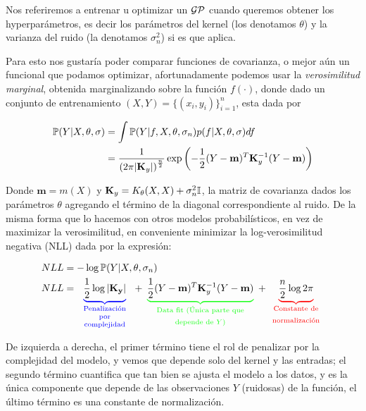 Nos referiremos a entrenar u optimizar un $\mathcal{GP}$ cuando queremos obtener los hyperparámetros, es decir los parámetros del kernel (los denotamos $\theta$) y la varianza del ruido (la denotamos $\sigma_n^2$) si es que aplica.

Para esto nos gustaría poder comparar funciones de covarianza, o mejor aún un funcional que podamos optimizar, afortunadamente podemos usar la \textit{verosimilitud marginal}, obtenida marginalizando sobre la función $f(\cdot)$, donde dado un conjunto de entrenamiento $(X, Y)= \{(x_i, y_i)\}_{i=1}^{n}$, esta dada por

\begin{align}
	\mathbb{P}(Y|X, \theta, \sigma) & = \int \mathbb{P}(Y|f, X, \theta, \sigma_n) p(f|X,\theta, \sigma) df \\
	& = \frac{1}{\left( 2\pi |\mathbf{K}_y|\right)^{\frac{n}{2}}} 
	\exp \left(
	-\frac{1}{2} (Y - \mathbf{m})^T \mathbf{K}_y^{-1} (Y - \mathbf{m})
	\right)
\end{align}

Donde $\mathbf{m}=m(X)$ y $\mathbf{K}_y=K_{\theta}(X,X) + \sigma_n^2 {\mathbb I}$, la matriz de covarianza dados los parámetros $\theta$ agregando el término de la diagonal correspondiente al ruido. De la misma forma que lo hacemos con otros modelos probabilísticos, en vez de maximizar la verosimilitud, en conveniente minimizar la log-verosimilitud negativa (NLL) dada por la expresión:

\begin{align}
	NLL & = -\log \pr(Y|X, \theta, \sigma_n) \\
	NLL & = \textcolor{blue}{\underbrace{ \color{black}{\frac{1}{2}\log|\mathbf{K_y}|} }_
	    {\text{\parbox{2cm}{\centering Penalización\\[-4pt] por\\[-4pt] complejidad}}}}
	    + \textcolor{Green}{\underbrace{ \color{black}{\frac{1}{2}(Y - \mathbf{m})^T \mathbf{K}_y^{-1} (Y - \mathbf{m}) }}_
	    {\text{\parbox{4cm}{\centering Data fit (Única parte que depende de $Y$)}}}}
	    + \textcolor{red}{\underbrace{ \color{black}{\frac{n}{2} \log2\pi}}_
	    {\text{\parbox{2cm}{\centering Constante de normalización}}}} \label{eq:gp_nll}
\end{align}

De izquierda a derecha, el primer término tiene el rol de penalizar por la complejidad del modelo, y vemos que depende solo del kernel y las entradas; el segundo término cuantifica que tan bien se ajusta el modelo a los datos, y es la única componente que depende de las observaciones $Y$ (ruidosas) de la función, el último término es una constante de normalización.\\


